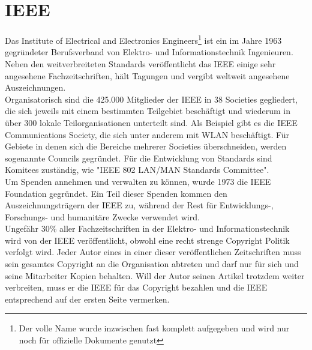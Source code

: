 \documentclass[a4paper,13pt]{scrartcl}
\begin{document}
\section{IEEE}
Das Institute of Electrical and Electronics Engineers\footnote{Der volle Name wurde inzwischen fast komplett aufgegeben und wird nur noch für offizielle Dokumente genutzt} ist ein im Jahre 1963 gegründeter Berufsverband von Elektro- und Informationstechnik Ingenieuren. Neben den weitverbreiteten Standards veröffentlicht das IEEE einige sehr angesehene Fachzeitschriften, hält Tagungen und vergibt weltweit angesehene Auszeichnungen. \\
Organisatorisch sind die 425.000 Mitglieder der IEEE in 38 Societies gegliedert, die sich jeweils mit einem bestimmten Teilgebiet beschäftigt und wiederum in über 300 lokale Teilorganisationen unterteilt sind. Als Beispiel gibt es die IEEE Communications Society, die sich unter anderem mit WLAN beschäftigt. Für Gebiete in denen sich die Bereiche mehrerer Societies überschneiden, werden sogenannte Councils gegründet. Für die Entwicklung von Standards sind Komitees zuständig, wie "IEEE 802 LAN/MAN Standards Committee".\\
Um Spenden annehmen und verwalten zu können, wurde 1973 die IEEE Foundation gegründet. Ein Teil dieser Spenden kommen den Auszeichnungsträgern der IEEE zu, während der Rest für Entwicklungs-, Forschungs- und humanitäre Zwecke verwendet wird. \\
Ungefähr 30\% aller Fachzeitschriften in der Elektro- und Informationstechnik wird von der IEEE veröffentlicht, obwohl eine recht strenge Copyright Politik verfolgt wird. Jeder Autor eines in einer dieser veröffentlichen Zeitschriften muss sein gesamtes Copyright an die Organisation abtreten und darf nur für sich und seine Mitarbeiter Kopien behalten. Will der Autor seinen Artikel trotzdem weiter verbreiten, muss er die IEEE für das Copyright bezahlen und die IEEE entsprechend auf der ersten Seite vermerken. \newpage
\end{document}
